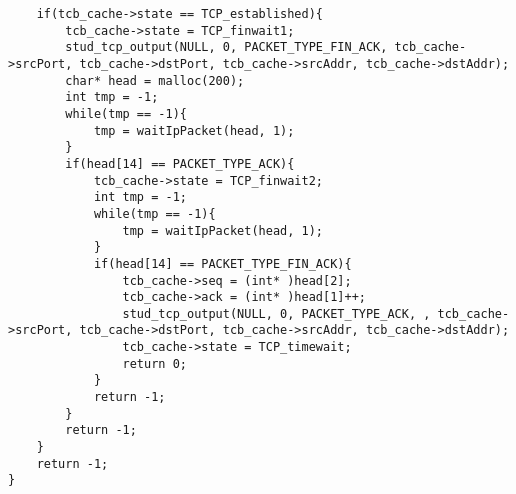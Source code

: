 \documentclass{article}
\begin{document}
\begin{lstlisting}
    if(tcb_cache->state == TCP_established){
        tcb_cache->state = TCP_finwait1;
        stud_tcp_output(NULL, 0, PACKET_TYPE_FIN_ACK, tcb_cache->srcPort, tcb_cache->dstPort, tcb_cache->srcAddr, tcb_cache->dstAddr);
        char* head = malloc(200);
        int tmp = -1;
        while(tmp == -1){
            tmp = waitIpPacket(head, 1);
        }
        if(head[14] == PACKET_TYPE_ACK){
            tcb_cache->state = TCP_finwait2;
            int tmp = -1;
            while(tmp == -1){
                tmp = waitIpPacket(head, 1);
            }
            if(head[14] == PACKET_TYPE_FIN_ACK){
                tcb_cache->seq = (int* )head[2];
                tcb_cache->ack = (int* )head[1]++;
                stud_tcp_output(NULL, 0, PACKET_TYPE_ACK, , tcb_cache->srcPort, tcb_cache->dstPort, tcb_cache->srcAddr, tcb_cache->dstAddr);
                tcb_cache->state = TCP_timewait;
                return 0;
            }
            return -1;
        }
        return -1;
    }
    return -1;
}

\end{lstlisting}
\end{document}
